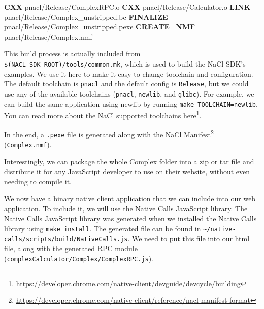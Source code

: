 \documentclass[]{article}
\newenvironment{Shaded}{}{}
\newcommand{\KeywordTok}[1]{\textcolor[rgb]{0.00,0.44,0.13}{\textbf{{#1}}}}
\newcommand{\NormalTok}[1]{{#1}}
\begin{document}
\begin{Shaded}
\begin{Highlighting}[]
  \KeywordTok{CXX}  \NormalTok{pnacl/Release/ComplexRPC.o}
  \KeywordTok{CXX}  \NormalTok{pnacl/Release/Calculator.o}
  \KeywordTok{LINK} \NormalTok{pnacl/Release/Complex_unstripped.bc}
  \KeywordTok{FINALIZE} \NormalTok{pnacl/Release/Complex_unstripped.pexe}
  \KeywordTok{CREATE_NMF} \NormalTok{pnacl/Release/Complex.nmf}
\end{Highlighting}
\end{Shaded}

This build process is actually included from
\texttt{\$(NACL\_SDK\_ROOT)/tools/common.mk}, which is used to build the
NaCl SDK's examples. We use it here to make it easy to change toolchain
and configuration. The default toolchain is \texttt{pnacl} and the
default config is \texttt{Release}, but we could use any of the
available toolchains (\texttt{pnacl}, \texttt{newlib}, and
\texttt{glibc}). For example, we can build the same application using
newlib by running \texttt{make TOOLCHAIN=newlib}. You can read more
about the NaCl supported toolchains
here\footnote{\url{https://developer.chrome.com/native-client/devguide/devcycle/building}}.

In the end, a \texttt{.pexe} file is generated along with the
NaCl Manifest\footnote{\url{https://developer.chrome.com/native-client/reference/nacl-manifest-format}} (\texttt{Complex.nmf}).

Interestingly, we can package the whole Complex folder into a zip or tar
file and distribute it for any JavaScript developer to use on their
website, without even needing to compile it.


We now have a binary native client application that we can include into
our web application. To include it, we will use the Native Calls
JavaScript library. The Native Calls JavaScript library was generated
when we installed the Native Calls library using \texttt{make install}.
The generated file can be found in
\texttt{\textasciitilde{}/native-calls/scripts/build/NativeCalls.js}. We
need to put this file into our html file, along with the generated RPC
module (\texttt{complexCalculator/Complex/ComplexRPC.js}).
\end{document}
